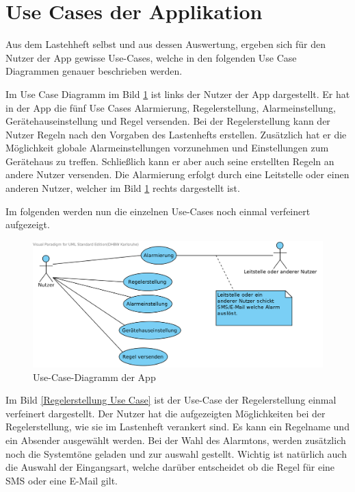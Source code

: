 \section{Use Cases der Applikation}
Aus dem Lastehheft selbst und aus dessen Auswertung, ergeben sich f\"ur den Nutzer der App gewisse Use-Cases, welche in den folgenden Use Case Diagrammen genauer beschrieben werden.

Im Use Case Diagramm im Bild \ref{Main Use Case} ist links der Nutzer der App dargestellt. Er hat in der App die f\"unf Use Cases Alarmierung, Regelerstellung, Alarmeinstellung, Ger\"atehauseinstellung und Regel versenden. Bei der Regelerstellung kann der Nutzer Regeln nach den Vorgaben des Lastenhefts erstellen. Zus\"atzlich hat er die M\"oglichkeit globale Alarmeinstellungen vorzunehmen und Einstellungen zum Ger\"atehaus zu treffen. Schlie\ss{}lich kann er aber auch seine erstellten Regeln an andere Nutzer versenden. 
Die Alarmierung erfolgt durch eine Leitstelle oder einen anderen Nutzer, welcher im Bild \ref{Main Use Case} rechts dargestellt ist.

Im folgenden werden nun die einzelnen Use-Cases noch einmal verfeinert aufgezeigt.
\begin{figure}[!ht]
\centering
\includegraphics[width=16cm]{Bilder/AlarmSMS_App.png}
\caption{Use-Case-Diagramm der App}
\label{Main Use Case}
\centering
\end{figure}

Im Bild \ref{Regelerstellung Use Case} ist der Use-Case der Regelerstellung einmal verfeinert dargestellt. Der Nutzer hat die aufgezeigten M\"oglichkeiten bei der Regelerstellung, wie sie im Lastenheft verankert sind. Es kann ein Regelname und ein Absender ausgew\"ahlt werden. Bei der Wahl des Alarmtons, werden zus\"atzlich noch die Systemt\"one geladen und zur auswahl gestellt. Wichtig ist nat\"urlich auch die Auswahl der Eingangsart, welche dar\"uber entscheidet ob die Regel f\"ur eine SMS oder eine E-Mail gilt. 

